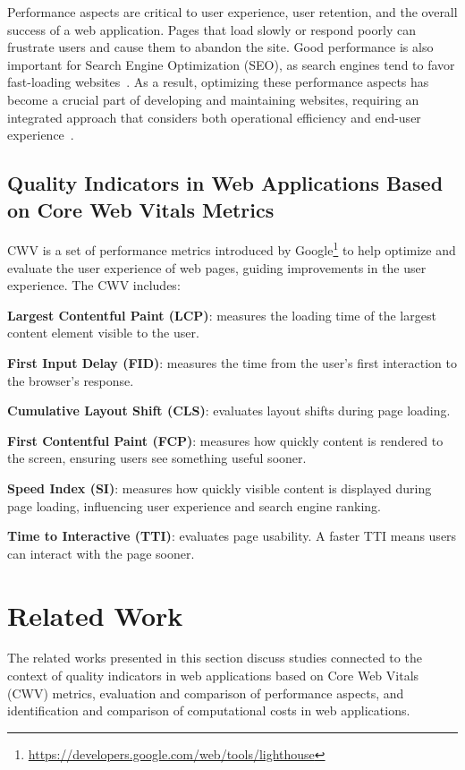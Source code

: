 \documentclass{sbc2019}%
\begin{document}
Performance aspects are critical to user experience, user retention, and the overall success of a web application. Pages that load slowly or respond poorly can frustrate users and cause them to abandon the site. Good performance is also important for Search Engine Optimization (SEO), as search engines tend to favor fast-loading websites~\cite{clientServerSide:2020}. As a result, optimizing these performance aspects has become a crucial part of developing and maintaining websites, requiring an integrated approach that considers both operational efficiency and end-user experience~\cite{pageExp:2022}.

\subsection{Quality Indicators in Web Applications Based on Core Web Vitals Metrics}
\label{sec:quality_indicators}

CWV is a set of performance metrics introduced by Google\footnote{\url{https://developers.google.com/web/tools/lighthouse}} to help optimize and evaluate the user experience of web pages, guiding improvements in the user experience. The CWV includes:

\textbf{Largest Contentful Paint (LCP)}: measures the loading time of the largest content element visible to the user.

\textbf{First Input Delay (FID)}: measures the time from the user's first interaction to the browser's response.

\textbf{Cumulative Layout Shift (CLS)}: evaluates layout shifts during page loading.

\textbf{First Contentful Paint (FCP)}: measures how quickly content is rendered to the screen, ensuring users see something useful sooner.

\textbf{Speed Index (SI)}: measures how quickly visible content is displayed during page loading, influencing user experience and search engine ranking.

\textbf{Time to Interactive (TTI)}: evaluates page usability. A faster TTI means users can interact with the page sooner.

\section{Related Work}\label{sec:related_work}

The related works presented in this section discuss studies connected to the context of quality indicators in web applications based on Core Web Vitals (CWV) metrics, evaluation and comparison of performance aspects, and identification and comparison of computational costs in web applications.
\end{document}
